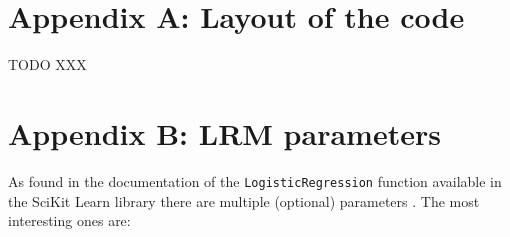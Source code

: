 \chapter*{Appendix A: Layout of the code}

TODO XXX


\chapter*{Appendix B: LRM parameters}

As found in the documentation of the \texttt{LogisticRegression} function available in the SciKit Learn library there are multiple (optional) parameters \citep{scikit_learn}.
The most interesting ones are:

